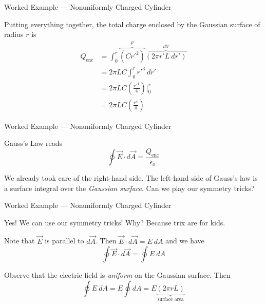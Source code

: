 \documentclass{beamer}
\begin{document}
\begin{frame}{Worked Example --- Nonuniformly Charged Cylinder}

Putting everything together, the total charge enclosed by the Gaussian surface of radius $r$ is
\begin{align*}
    Q_{\text{enc}} &= \int_{0}^{r} \overbrace{\left( C r'^2 \right)}^{\rho} \overbrace{\left( 2\pi r' L\ dr' \right)}^{dV} \\
                   &= 2\pi L C \int_{0}^{r} r'^3\ dr' \\
                   &= 2\pi L C \left( \frac{r'^4}{4} \right) \bigg|_{0}^{r} \\
                   &= 2\pi L C \left( \frac{r^4}{4} \right)
\end{align*}

\end{frame}

\begin{frame}{Worked Example --- Nonuniformly Charged Cylinder}

Gauss's Law reads
\begin{equation*}
    \oint \vec{E} \cdot d\vec{A} = \frac{Q_{\text{enc}}}{\epsilon_o}
\end{equation*}

We already took care of the right-hand side. The left-hand side of Gauss's law is a surface integral over the \emph{Gaussian surface}. Can we play our symmetry tricks?

\end{frame}

\begin{frame}{Worked Example --- Nonuniformly Charged Cylinder}

Yes! We can use our symmetry tricks! Why? Because trix are for kids.

\vfill

Note that $\vec{E}$ is parallel to $d\vec{A}$. Then $\vec{E} \cdot d\vec{A} = E\ dA$ and we have
\begin{equation*}
    \oint \vec{E} \cdot d\vec{A} = \oint E\ dA
\end{equation*}

Observe that the electric field is \emph{uniform} on the Gaussian surface. Then
\begin{equation*}
    \oint E\ dA = E \oint dA = E \underbrace{\left( 2\pi r L \right)}_{\text{surface area}}
\end{equation*}

\end{frame}
\end{document}
